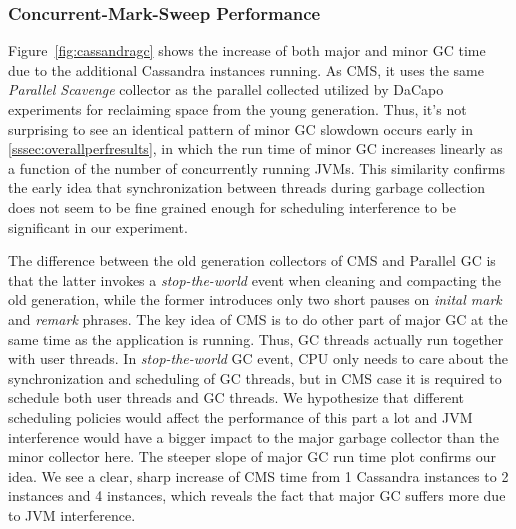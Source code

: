 \documentclass{sig-alternate}
\begin{document}
\subsubsection{Concurrent-Mark-Sweep Performance}
Figure~\ref{fig:cassandragc} shows the increase of both major and minor GC time due to the additional Cassandra instances running. As CMS, it uses the same \textit{Parallel Scavenge} collector as the parallel collected utilized by DaCapo experiments for reclaiming space from the young generation. Thus, it's not surprising to see an identical pattern of minor GC slowdown occurs early in \ref{sssec:overallperfresults}, in which the run time of minor GC increases linearly as a function of the number of concurrently running JVMs. This similarity confirms the early idea that synchronization between threads during garbage collection does not seem to be fine grained enough for scheduling interference to be significant in our experiment.

The difference between the old generation collectors of CMS and Parallel GC is that the latter invokes a \textit{stop-the-world} event when cleaning and compacting the old generation, while the former introduces only two short pauses on \textit{inital mark} and \textit{remark} phrases. The key idea of CMS is to do other part of major GC at the same time as the application is running. Thus, GC threads actually run together with user threads. In \textit{stop-the-world} GC event, CPU only needs to care about the synchronization and scheduling of GC threads, but in CMS case it is required to schedule both user threads and GC threads. We hypothesize that different scheduling policies would affect the performance of this part a lot and JVM interference would have a bigger impact to the major garbage collector than the minor collector here. The steeper slope of major GC run time plot confirms our idea. We see a clear, sharp increase of CMS time from 1 Cassandra instances to 2 instances and 4 instances, which reveals the fact that major GC suffers more due to JVM interference.


%
\end{document}
